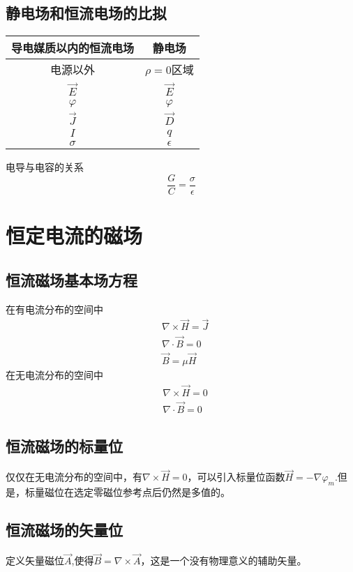 \documentclass{ctexart}
\begin{document}
\subsection{静电场和恒流电场的比拟}
\begin{table}[H]
    \centering
    \begin{tabular}{cc}
        \hline
        导电媒质以内的恒流电场&静电场\\ \hline
        电源以外&$\rho=0$区域\\
        $\vec{E}$&$\vec{E}$\\
        $\varphi$&$\varphi$\\
        $\vec{J}$&$\vec{D}$\\
        $I$&$q$\\
        $\sigma$&$\epsilon$ \\ \hline
    \end{tabular}
\end{table}
电导与电容的关系
\begin{equation}
    \dfrac{G}{C}=\dfrac{\sigma}{\epsilon}
\end{equation}
\section{恒定电流的磁场}
\subsection{恒流磁场基本场方程}
在有电流分布的空间中
\begin{align}
    &\nabla \times \vec{H}=\vec{J}\\
    &\nabla \cdot \vec{B}=0\\
    &\vec{B}=\mu \vec{H}
\end{align}
在无电流分布的空间中
\begin{align}
    &\nabla \times \vec{H}=0\\
    &\nabla \cdot \vec{B}=0
\end{align}
\subsection{恒流磁场的标量位}
仅仅在无电流分布的空间中，有$\nabla \times \vec{H}=0$，可以引入标量位函数$\vec{H}=-\nabla \varphi_m$.但是，标量磁位在选定零磁位参考点后仍然是多值的。
\subsection{恒流磁场的矢量位}
定义矢量磁位$\vec{A}$,使得$\vec{B}=\nabla \times \vec{A}$，这是一个没有物理意义的辅助矢量。
\end{document}
